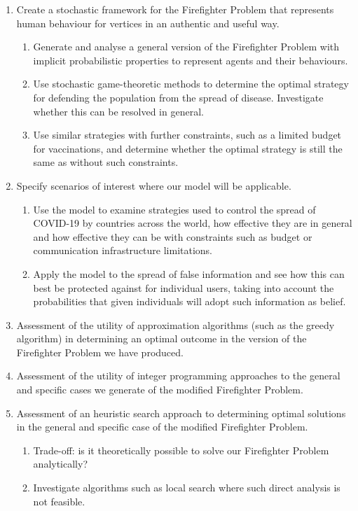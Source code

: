 \documentclass[hidelinks,a4paper,11pt]{article}
\numberwithin{equation}{section}
\begin{document}
\begin{enumerate}
	\item Create a stochastic framework for the Firefighter Problem that represents human behaviour for vertices in an authentic and useful way.
	\begin{enumerate}
		\item Generate and analyse a general version of the Firefighter Problem with implicit probabilistic properties to represent agents and their behaviours.
		\item Use stochastic game-theoretic methods to determine the optimal strategy for defending the population from the spread of disease. Investigate whether this can be resolved in general.
		\item Use similar strategies with further constraints, such as a limited budget for vaccinations, and determine whether the optimal strategy is still the same as without such constraints.
	\end{enumerate}
	\item Specify scenarios of interest where our model will be applicable.
	\begin{enumerate}
		\item Use the model to examine strategies used to control the spread of COVID-19 by countries across the world, how effective they are in general and how effective they can be with constraints such as budget or communication infrastructure limitations.
		\item Apply the model to the spread of false information and see how this can best be protected against for individual users, taking into account the probabilities that given individuals will adopt such information as belief.
		\end{enumerate}
	\item Assessment of the utility of approximation algorithms (such as the greedy algorithm) in determining an optimal outcome in the version of the Firefighter Problem we have produced.
	\item Assessment of the utility of integer programming approaches to the general and specific cases we generate of the modified Firefighter Problem.
	\item Assessment of an heuristic search approach to determining optimal solutions in the general and specific case of the modified Firefighter Problem.
	\begin{enumerate}
		\item Trade-off: is it theoretically possible to solve our Firefighter Problem analytically?
		\item Investigate algorithms such as local search where such direct analysis is not feasible.
	\end{enumerate}
\end{enumerate}
\end{document}
